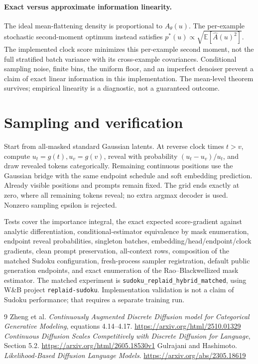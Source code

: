 \documentclass[11pt]{article}
\newcommand{\E}{\mathbb E}
\begin{document}
\paragraph{Exact versus approximate information linearity.}
The ideal mean-flattening density is proportional to $A_\theta(u)$.
The per-example stochastic second-moment optimum instead satisfies
$p^*(u)\propto\sqrt{\E[\widehat A(u)^2]}$. The implemented clock score minimizes this per-example second moment, not
the full stratified batch variance with its cross-example covariances.
Conditional sampling noise,
finite bins, the uniform floor, and an imperfect denoiser prevent a claim of
exact linear information in this implementation. The mean-level theorem
survives; empirical linearity is a diagnostic, not a guaranteed outcome.

\section{Sampling and verification}
Start from all-masked standard Gaussian latents. At reverse clock times
$t>v$, compute $u_t=g(t),u_v=g(v)$, reveal with probability
$(u_t-u_v)/u_t$, and draw revealed tokens categorically. Remaining continuous
positions use the Gaussian bridge with the same endpoint schedule and soft
embedding prediction. Already visible positions and prompts remain fixed.
The grid ends exactly at zero, where all remaining tokens reveal; no extra
argmax decoder is used. Nonzero sampling epsilon is rejected.

Tests cover the importance integral, the exact expected score-gradient
against analytic differentiation, conditional-estimator equivalence by
mask enumeration, endpoint reveal probabilities, singleton batches,
embedding/head/endpoint/clock gradients, clean prompt preservation,
all-context rows, composition of the matched Sudoku configuration, fresh-process sampler
registration, default public generation endpoints, and exact enumeration
of the Rao--Blackwellized mask estimator.
The matched experiment is \texttt{sudoku\_replaid\_hybrid\_matched}, using
W\&B project \texttt{replaid-sudoku}. Implementation validation is not a
claim of Sudoku performance; that requires a separate training run.

\begin{thebibliography}{9}
 Zheng et al. \emph{Continuously Augmented Discrete Diffusion
model for Categorical Generative Modeling}, equations 4.14--4.17.
\url{https://arxiv.org/html/2510.01329}
 \emph{Continuous Diffusion Scales Competitively with
Discrete Diffusion for Language}, Section 5.2.
\url{https://arxiv.org/html/2605.18530v1}
 Gulrajani and Hashimoto. \emph{Likelihood-Based Diffusion
Language Models}. \url{https://arxiv.org/abs/2305.18619}
\end{thebibliography}
\end{document}
